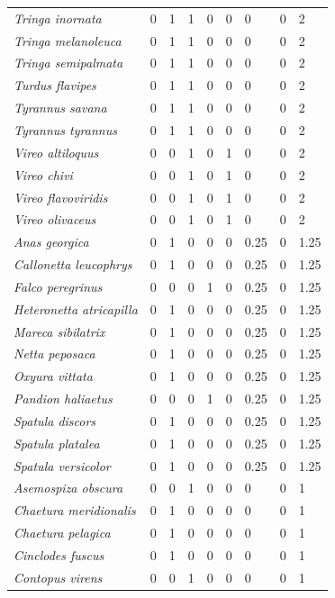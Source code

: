 \documentclass[
  oneside]{scrbook}
\begin{document}
\begin{ThreePartTable}
\begin{longtable}[t]{>{}lrrrrrlrl}
\em{Tringa inornata} & 0 & 1 & 1 & 0 & 0 & 0 & 0 & 2\\
\em{Tringa melanoleuca} & 0 & 1 & 1 & 0 & 0 & 0 & 0 & 2\\
\em{Tringa semipalmata} & 0 & 1 & 1 & 0 & 0 & 0 & 0 & 2\\
\addlinespace
\em{Turdus flavipes} & 0 & 1 & 1 & 0 & 0 & 0 & 0 & 2\\
\em{Tyrannus savana} & 0 & 1 & 1 & 0 & 0 & 0 & 0 & 2\\
\em{Tyrannus tyrannus} & 0 & 1 & 1 & 0 & 0 & 0 & 0 & 2\\
\em{Vireo altiloquus} & 0 & 0 & 1 & 0 & 1 & 0 & 0 & 2\\
\em{Vireo chivi} & 0 & 0 & 1 & 0 & 1 & 0 & 0 & 2\\
\addlinespace
\em{Vireo flavoviridis} & 0 & 0 & 1 & 0 & 1 & 0 & 0 & 2\\
\em{Vireo olivaceus} & 0 & 0 & 1 & 0 & 1 & 0 & 0 & 2\\
\em{Anas georgica} & 0 & 1 & 0 & 0 & 0 & 0.25 & 0 & 1.25\\
\em{Callonetta leucophrys} & 0 & 1 & 0 & 0 & 0 & 0.25 & 0 & 1.25\\
\em{Falco peregrinus} & 0 & 0 & 0 & 1 & 0 & 0.25 & 0 & 1.25\\
\addlinespace
\em{Heteronetta atricapilla} & 0 & 1 & 0 & 0 & 0 & 0.25 & 0 & 1.25\\
\em{Mareca sibilatrix} & 0 & 1 & 0 & 0 & 0 & 0.25 & 0 & 1.25\\
\em{Netta peposaca} & 0 & 1 & 0 & 0 & 0 & 0.25 & 0 & 1.25\\
\em{Oxyura vittata} & 0 & 1 & 0 & 0 & 0 & 0.25 & 0 & 1.25\\
\em{Pandion haliaetus} & 0 & 0 & 0 & 1 & 0 & 0.25 & 0 & 1.25\\
\addlinespace
\em{Spatula discors} & 0 & 1 & 0 & 0 & 0 & 0.25 & 0 & 1.25\\
\em{Spatula platalea} & 0 & 1 & 0 & 0 & 0 & 0.25 & 0 & 1.25\\
\em{Spatula versicolor} & 0 & 1 & 0 & 0 & 0 & 0.25 & 0 & 1.25\\
\em{Asemospiza obscura} & 0 & 0 & 1 & 0 & 0 & 0 & 0 & 1\\
\em{Chaetura meridionalis} & 0 & 1 & 0 & 0 & 0 & 0 & 0 & 1\\
\addlinespace
\em{Chaetura pelagica} & 0 & 1 & 0 & 0 & 0 & 0 & 0 & 1\\
\em{Cinclodes fuscus} & 0 & 1 & 0 & 0 & 0 & 0 & 0 & 1\\
\em{Contopus virens} & 0 & 0 & 1 & 0 & 0 & 0 & 0 & 1\\

\end{longtable}
\end{ThreePartTable}
\end{document}
